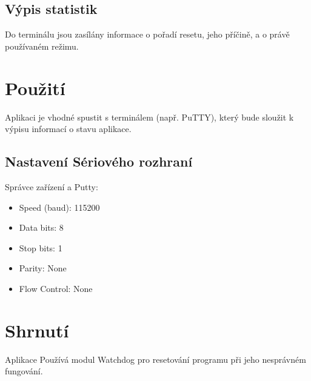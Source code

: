 \documentclass[12pt,a4paper,final]{article}
\begin{document}
\subsection{Výpis statistik}
Do terminálu jsou zasílány informace o pořadí resetu, jeho příčině, a o právě používaném režimu.

\section{Použití}
Aplikaci je vhodné spustit s terminálem (např. PuTTY), který bude sloužit k výpisu informací o stavu aplikace.

\subsection{Nastavení Sériového rozhraní}
Správce zařízení a Putty:
\begin{itemize}
    \item Speed (baud): 115200
    \item Data bits: 8
    \item Stop bits: 1
    \item Parity: None
    \item Flow Control: None
\end{itemize} 

\section{Shrnutí}
Aplikace Používá modul Watchdog pro resetování programu při jeho nesprávném fungování.
\end{document}
